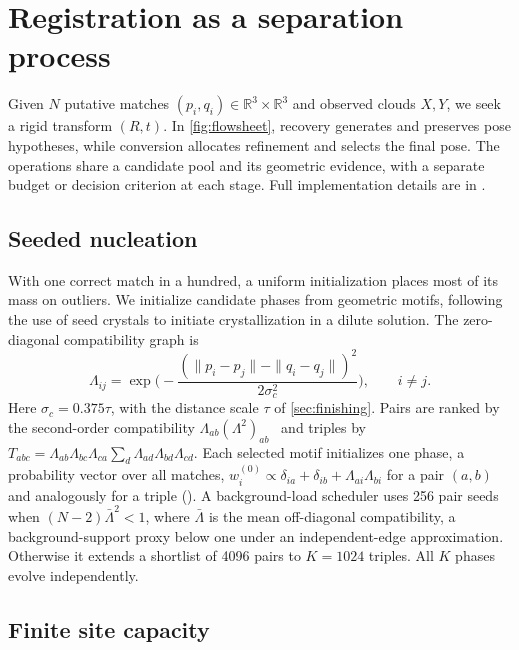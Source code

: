 \section{Registration as a separation process}
\label{sec:method}

Given $N$ putative matches $(p_i,q_i)\in\mathbb R^3\times\mathbb R^3$ and observed clouds $X,Y$, we seek a rigid transform $(R,t)$. In \cref{fig:flowsheet}, recovery generates and preserves pose hypotheses, while conversion allocates refinement and selects the final pose. The operations share a candidate pool and its geometric evidence, with a separate budget or decision criterion at each stage. Full implementation details are in .

\subsection{Seeded nucleation}
\label{sec:nucleation}

With one correct match in a hundred, a uniform initialization places most of its mass on outliers. We initialize candidate phases from geometric motifs, following the use of seed crystals to initiate crystallization in a dilute solution. The zero-diagonal compatibility graph is
\begin{equation}
\Lambda_{ij}=\exp\!\Big(-\frac{(\|p_i-p_j\|-\|q_i-q_j\|)^2}{2\sigma_c^2}\Big),\qquad i\neq j.
\label{eq:compat}
\end{equation}
Here $\sigma_c=0.375\tau$, with the distance scale $\tau$ of \cref{sec:finishing}. Pairs are ranked by the second-order compatibility $\Lambda_{ab}(\Lambda^2)_{ab}$~\cite{chen2022sc2} and triples by $T_{abc}=\Lambda_{ab}\Lambda_{bc}\Lambda_{ca}\sum_d\Lambda_{ad}\Lambda_{bd}\Lambda_{cd}$. Each selected motif initializes one phase, a probability vector over all matches, $w^{(0)}_i\propto\delta_{ia}+\delta_{ib}+\Lambda_{ai}\Lambda_{bi}$ for a pair $(a,b)$ and analogously for a triple (). A background-load scheduler uses 256 pair seeds when $(N-2)\bar\Lambda^2<1$, where $\bar\Lambda$ is the mean off-diagonal compatibility, a background-support proxy below one under an independent-edge approximation. Otherwise it extends a shortlist of 4096 pairs to $K=1024$ triples. All $K$ phases evolve independently.

\subsection{Finite site capacity}
\label{sec:capacity}

